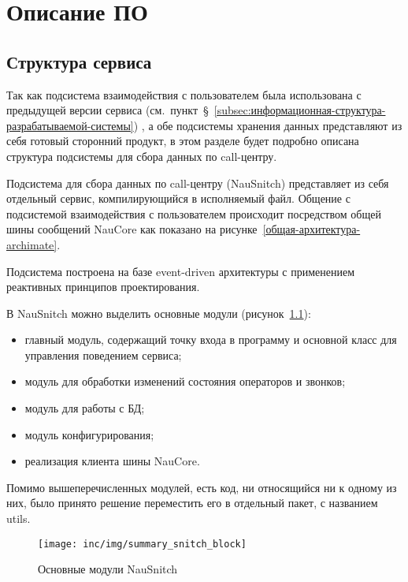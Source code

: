 \chapter{Описание ПО}
\label{ch:impl}

\section{Структура сервиса}

Так как подсистема взаимодействия с пользователем была использована
с предыдущей версии сервиса (см.~пункт~\S~\ref{subsec:информационная-структура-разрабатываемой-системы})
, а обе подсистемы хранения данных представляют из себя
готовый сторонний продукт, в этом разделе будет подробно описана
структура подсистемы для сбора данных по call-центру.

Подсистема для сбора данных по call-центру (NauSnitch) представляет из себя
отдельный сервис, компилирующийся в исполняемый файл.
Общение с подсистемой взаимодействия с пользователем
происходит посредством общей шины сообщений NauCore как показано на рисунке~\ref{общая-архитектура-archimate}.

Подсистема построена на базе event-driven архитектуры
с применением реактивных принципов проектирования.

В NauSnitch можно выделить основные модули (рисунок~\ref{pic:snitch:summary-block}):
\begin{itemize}
    \item главный модуль, содержащий точку входа в программу
    и основной класс для управления поведением сервиса;
    \item модуль для обработки изменений состояния операторов и звонков;
    \item модуль для работы с БД;
    \item модуль конфигурирования;
    \item реализация клиента шины NauCore.
\end{itemize}
Помимо вышеперечисленных модулей, есть код, ни относящийся ни к одному из них,
было принято решение переместить его в отдельный пакет, с названием utils.

\begin{figure}[ht]
    \centering
    \texttt{[image: inc/img/summary\_snitch\_block]}
    \caption{Основные модули NauSnitch}
    \label{pic:snitch:summary-block}
\end{figure}

